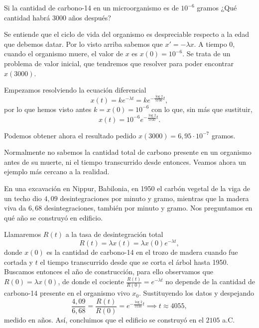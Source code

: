 \documentclass[../ecuaciones_diferenciales.tex]{subfiles}
\begin{document}
\begin{example}
	Si la cantidad de carbono-14 en un microorganismo es de \(10^{-6}\) gramos
	¿Qué cantidad habrá 3000 años después?
\end{example}

\begin{solution}
	Se entiende que el ciclo de vida del organismo es despreciable respecto a la
	edad que debemos datar. Por lo visto arriba sabemos que \(x' = -\lambda x\).
	A tiempo \(0\), cuando el organismo muere, el valor de \(x\) es
	\(x(0) = 10^{-6}\). Se trata de un problema de valor inicial, que tendremos
	que resolver para poder encontrar \(x(3000)\). 

	Empezamos resolviendo la ecuación diferencial
	\[x(t) = k e^{-\lambda t} = k e^{-\frac{\log 2}{5730} t},\]
	por lo que hemos visto antes \(k = x(0) = 10^{-6}\) con lo que, sin más que
	sustituir,
	\[x(t) = 10^{-6} e^{-\frac{\log 2}{5730} t}.\]

	Podemos obtener ahora el resultado pedido 
	\(x(3000) = 6,95 \cdot 10^{-7}\) gramos.
\end{solution}

Normalmente no sabemos la cantidad total de carbono presente en un organismo
antes de su muerte, ni el tiempo transcurrido desde entonces. Veamos ahora un
ejemplo más cercano a la realidad.

\begin{example}
	En una excavación en Nippur, Babilonia, en 1950 el carbón vegetal de la viga
	de un techo dio \(4,09\) desintegraciones por minuto y gramo, mientras que
	la madera viva da \(6,68\) desintegraciones, también por minuto y gramo.
	Nos preguntamos en qué año se construyó en edificio.
\end{example}

\begin{solution}
	Llamaremos \(R(t)\) a la tasa de desintegración total
	\[R(t) = \lambda x(t) = \lambda x(0) e^{-\lambda t},\]
	donde \(x(0)\) es la
	cantidad de carbono-14 en el trozo de madera cuando fue cortada y \(t\) el
	tiempo transcurrido desde que se corta el árbol hasta 1950. Buscamos entonces
	el año de construcción, para ello observamos que \(R(0) = \lambda x(0)\), de
	donde el cociente \(\frac{R(t)}{R(0)} = e^{-\lambda t}\) no depende de la
	cantidad de carbono-14 presente en el organismo vivo \(x_0\). Sustituyendo
	los datos y despejando
	\[\frac{4,09}{6,68} = \frac{R(t)}{R(0)} = e^{-\frac{\log 2}{5730} t}
		\implies t \approx 4055,\]
	medido en años. Así, concluimos que el edificio se construyó en el \(2105\)
	a.C.
\end{solution}
\end{document}
